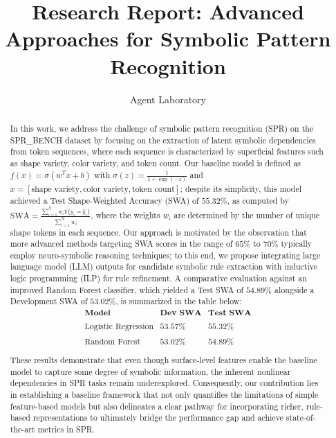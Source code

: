 \documentclass{article}
\title{Research Report: Advanced Approaches for Symbolic Pattern Recognition}
\author{Agent Laboratory}
\date{}
\begin{document}
\maketitle

\begin{abstract}
In this work, we address the challenge of symbolic pattern recognition (SPR) on the SPR\_BENCH dataset by focusing on the extraction of latent symbolic dependencies from token sequences, where each sequence is characterized by superficial features such as shape variety, color variety, and token count. Our baseline model is defined as \( f(x) = \sigma(w^T x + b) \) with \( \sigma(z) = \frac{1}{1+\exp(-z)} \) and \( x = [\text{shape variety}, \text{color variety}, \text{token count}] \); despite its simplicity, this model achieved a Test Shape-Weighted Accuracy (SWA) of \(55.32\%\), as computed by \( \text{SWA} = \frac{\sum_{i=1}^N w_i \mathbf{1}\{y_i=\hat{y}_i\}}{\sum_{i=1}^N w_i} \), where the weights \(w_i\) are determined by the number of unique shape tokens in each sequence. Our approach is motivated by the observation that more advanced methods targeting SWA scores in the range of \(65\%\) to \(70\%\) typically employ neuro-symbolic reasoning techniques; to this end, we propose integrating large language model (LLM) outputs for candidate symbolic rule extraction with inductive logic programming (ILP) for rule refinement. A comparative evaluation against an improved Random Forest classifier, which yielded a Test SWA of \(54.89\%\) alongside a Development SWA of \(53.02\%\), is summarized in the table below:
\[
\begin{array}{lcc}
\textbf{Model} & \textbf{Dev SWA} & \textbf{Test SWA} \\\\ \hline
\text{Logistic Regression} & 53.57\% & 55.32\% \\\\
\text{Random Forest} & 53.02\% & 54.89\% \\\\
\end{array}
\]
These results demonstrate that even though surface-level features enable the baseline model to capture some degree of symbolic information, the inherent nonlinear dependencies in SPR tasks remain underexplored. Consequently, our contribution lies in establishing a baseline framework that not only quantifies the limitations of simple feature-based models but also delineates a clear pathway for incorporating richer, rule-based representations to ultimately bridge the performance gap and achieve state-of-the-art metrics in SPR.
\end{abstract}
\end{document}
